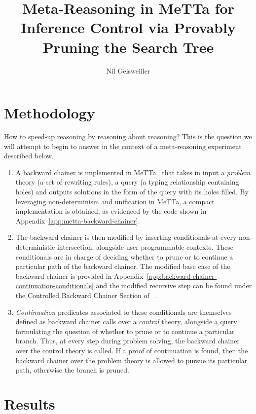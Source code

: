 \documentclass{easychair}
\title{Meta-Reasoning in MeTTa for Inference Control via Provably
  Pruning the Search Tree}
\author{Nil Geisweiller}
\institute{
  SingularityNET Foundation,\\
  Zug, Switzerland\\
  \email{nil@singularitynet.io}
}
\begin{document}
\maketitle

\section{Methodology}
\label{sect:introduction}

How to speed-up reasoning by reasoning about reasoning?  This is the
question we will attempt to begin to answer in the context of a
meta-reasoning experiment described below.
\begin{enumerate}
\item A backward chainer is implemented in MeTTa~\cite{MeTTa} that
  takes in input a \emph{problem} theory (a set of rewriting rules), a
  query (a typing relationship containing holes) and outputs solutions
  in the form of the query with its holes filled.  By leveraging
  non-determinism and unification in MeTTa, a compact implementation
  is obtained, as evidenced by the code shown in
  Appendix~\ref{app:metta-backward-chainer}.
\item The backward chainer is then modified by inserting conditionals
  at every non-deterministic intersection, alongside user programmable
  contexts.  These conditionals are in charge of deciding whether to
  prune or to continue a particular path of the backward chainer.  The
  modified base case of the backward chainer is provided in
  Appendix~\ref{app:backward-chainer-continuation-conditionals} and
  the modified recursive step can be found under the Controlled
  Backward Chainer Section of ~\cite{Geisweiller2024ICM}.
\item \emph{Continuation} predicates associated to these conditionals
  are themselves defined as backward chainer calls over a
  \emph{control} theory, alongside a query formulating the question of
  whether to prune or to continue a particular branch.  Thus, at every
  step during problem solving, the backward chainer over the control
  theory is called.  If a proof of continuation is found, then the
  backward chainer over the problem theory is allowed to pursue its
  particular path, otherwise the branch is pruned.
\end{enumerate}

\section{Results}
\end{document}
